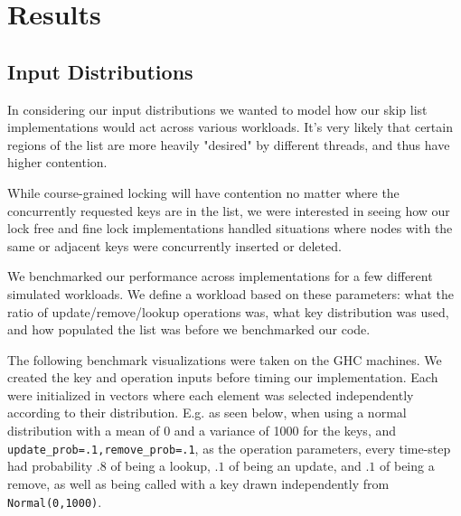 \documentclass[11pt]{article}
\newcommand{\ttt}[1]{\texttt{#1}}
\begin{document}
\section{Results}
\subsection{Input Distributions}
In considering our input distributions we wanted to model how our skip list implementations would act across various workloads. It's very likely that certain regions of the list are more heavily "desired" by different threads, and thus have higher contention.

While course-grained locking will have contention no matter where the concurrently requested keys are in the list, we were interested in seeing how our lock free and fine lock implementations handled situations where nodes with the same or adjacent keys were concurrently inserted or deleted.

We benchmarked our performance across implementations for a few different simulated workloads. We define a workload based on these parameters: what the ratio of update/remove/lookup operations was, what key distribution was used, and how populated the list was before we benchmarked our code.

The following benchmark visualizations were taken on the GHC machines. We created the key and operation inputs before timing our implementation. Each were initialized in vectors where each element was selected independently according to their distribution. E.g. as seen below, when using a normal distribution with a mean of 0 and a variance of 1000 for the keys, and \ttt{update\_prob=.1,remove\_prob=.1}, as the operation parameters, every time-step had probability $.8$ of being a lookup, $.1$ of being an update, and $.1$ of being a remove, as well as being called with a key drawn independently from \ttt{Normal(0,1000)}. 
\end{document}
